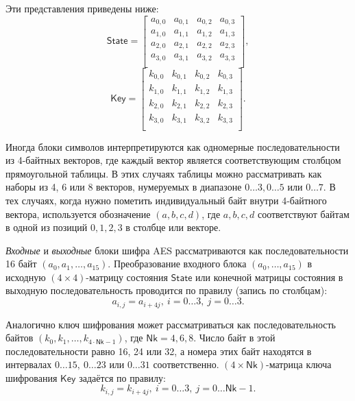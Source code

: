 Эти представления приведены ниже:
\[
    \mathsf{State} = \left[ \begin{array}{cccc}
        a_{0,0} & a_{0,1} & a_{0,2} & a_{0,3} \\
        a_{1,0} & a_{1,1} & a_{1,2} & a_{1,3} \\
        a_{2,0} & a_{2,1} & a_{2,2} & a_{2,3} \\
        a_{3,0} & a_{3,1} &a_{3,2} & a_{3,3}  \\
    \end{array} \right],
\] \[
    \mathsf{Key} = \left[ \begin{array}{cccc}
        k_{0,0} & k_{0,1} & k_{0,2} & k_{0,3} \\
        k_{1,0} & k_{1,1} & k_{1,2} & k_{1,3} \\
        k_{2,0} & k_{2,1} & k_{2,2} & k_{2,3} \\
        k_{3,0} & k_{3,1} & k_{3,2} & k_{3,3} \\
    \end{array} \right].
\]

Иногда блоки символов интерпретируются как одномерные последовательности из 4-байтных векторов, где каждый вектор является соответствующим столбцом прямоугольной таблицы. В этих случаях таблицы можно рассматривать как наборы из 4, 6 или 8 векторов, нумеруемых в диапазоне $0 \dots 3, 0 \dots 5$ или $0 \dots 7$. В тех случаях, когда нужно пометить индивидуальный байт внутри 4-байтного вектора, используется обозначение $(a, b, c, d)$, где $a, b, c, d$ соответствуют байтам в одной из позиций $0, 1, 2, 3$ в столбце или векторе.

\textit{Входные} и \textit{выходные} блоки шифра AES рассматриваются как последовательности 16 байт $(a_0, a_1, \dots, a_{15})$. Преобразование входного блока $(a_0, \dots, a_{15})$ в исходную $(4 \times 4)$-матрицу состояния $\mathsf{State}$ или конечной матрицы состояния в выходную последовательность проводится по правилу (запись по столбцам):
    \[ a_{i,j} = a_{i + 4j}, ~ i = 0 \dots 3, ~ j = 0 \dots 3. \]

Аналогично ключ шифрования может рассматриваться как последовательность байтов $(k_0, k_1, \dots, k_{4 \cdot \mathsf{Nk} - 1})$, где $\mathsf{Nk} = 4, 6, 8$. Число байт в этой последовательности равно 16, 24 или 32, а номера этих байт находятся в интервалах $0 \dots 15, ~ 0 \dots 23$ или $0 \dots 31$ соответственно. $(4 \times \mathsf{Nk})$-матрица ключа шифрования $\mathsf{Key}$ задаётся по правилу:
    \[ k_{i,j} = k_{i + 4j}, ~ i = 0 \dots 3, ~ j = 0 \dots \mathsf{Nk} - 1. \]

